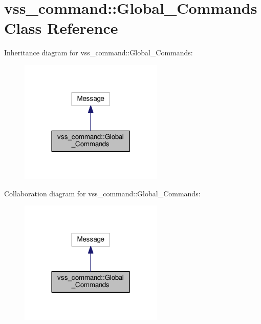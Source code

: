 \hypertarget{classvss__command_1_1Global__Commands}{}\section{vss\+\_\+command\+:\+:Global\+\_\+\+Commands Class Reference}
\label{classvss__command_1_1Global__Commands}


Inheritance diagram for vss\+\_\+command\+:\+:Global\+\_\+\+Commands\+:
\nopagebreak
\begin{figure}[H]
\begin{center}
\leavevmode
\includegraphics[width=194pt]{classvss__command_1_1Global__Commands__inherit__graph}
\end{center}
\end{figure}


Collaboration diagram for vss\+\_\+command\+:\+:Global\+\_\+\+Commands\+:
\nopagebreak
\begin{figure}[H]
\begin{center}
\leavevmode
\includegraphics[width=194pt]{classvss__command_1_1Global__Commands__coll__graph}
\end{center}
\end{figure}
